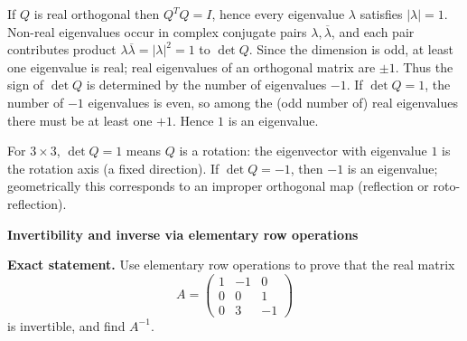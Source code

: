 \begin{solution}
If \(Q\) is real orthogonal then \(Q^TQ=I\), hence every eigenvalue \(\lambda\) satisfies \(|\lambda|=1\).
Non-real eigenvalues occur in complex conjugate pairs \(\lambda,\overline\lambda\), and each pair contributes product
\(\lambda\overline\lambda=|\lambda|^2=1\) to \(\det Q\).
Since the dimension is odd, at least one eigenvalue is real; real eigenvalues of an orthogonal matrix are \(\pm 1\).
Thus the sign of \(\det Q\) is determined by the number of eigenvalues \(-1\).
If \(\det Q=1\), the number of \(-1\) eigenvalues is even, so among the (odd number of) real eigenvalues there must be at least one \(+1\).
Hence \(1\) is an eigenvalue.

For \(3\times3\), \(\det Q=1\) means \(Q\) is a rotation: the eigenvector with eigenvalue \(1\) is the rotation axis (a fixed direction).
If \(\det Q=-1\), then \(-1\) is an eigenvalue; geometrically this corresponds to an improper orthogonal map (reflection or roto-reflection).
\end{solution}

\begin{problem}[CP-I-0049]
\label{prob:cp-i-0049}
\textbf{Invertibility and inverse via elementary row operations}

\textbf{Exact statement.}
\hspace*{1.5em}Use elementary row operations to prove that the real matrix
\[
A=\begin{pmatrix}
	1&-1&0\\
	0&0&1\\
	0&3&-1
\end{pmatrix}
\]
is invertible, and find \(A^{-1}\).

\end{problem}

